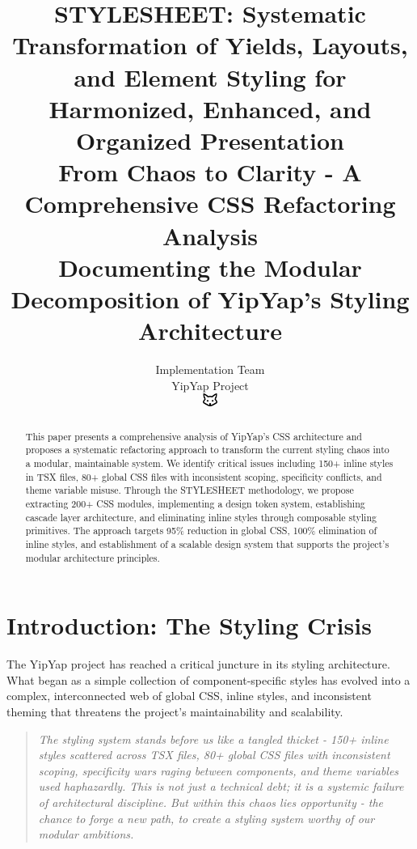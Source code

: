 \documentclass[11pt]{article}
\begin{document}
\title{\textbf{STYLESHEET: Systematic Transformation of Yields, Layouts, and Element Styling for Harmonized, Enhanced, and Organized Presentation} \\
\Large{From Chaos to Clarity - A Comprehensive CSS Refactoring Analysis} \\
\large{Documenting the Modular Decomposition of YipYap's Styling Architecture}}

\author{Implementation Team\\
YipYap Project\\
\includegraphics[width=0.5cm]{favicon.pdf}}

\maketitle

\begin{abstract}
This paper presents a comprehensive analysis of YipYap's CSS architecture and proposes a systematic refactoring approach to transform the current styling chaos into a modular, maintainable system. We identify critical issues including 150+ inline styles in TSX files, 80+ global CSS files with inconsistent scoping, specificity conflicts, and theme variable misuse. Through the STYLESHEET methodology, we propose extracting 200+ CSS modules, implementing a design token system, establishing cascade layer architecture, and eliminating inline styles through composable styling primitives. The approach targets 95\% reduction in global CSS, 100\% elimination of inline styles, and establishment of a scalable design system that supports the project's modular architecture principles.
\end{abstract}

\tableofcontents
\newpage

\section{Introduction: The Styling Crisis}

The YipYap project has reached a critical juncture in its styling architecture. What began as a simple collection of component-specific styles has evolved into a complex, interconnected web of global CSS, inline styles, and inconsistent theming that threatens the project's maintainability and scalability.

\begin{quote}
\emph{The styling system stands before us like a tangled thicket - 150+ inline styles scattered across TSX files, 80+ global CSS files with inconsistent scoping, specificity wars raging between components, and theme variables used haphazardly. This is not just a technical debt; it is a systemic failure of architectural discipline. But within this chaos lies opportunity - the chance to forge a new path, to create a styling system worthy of our modular ambitions.}
\end{quote}
\end{document}

